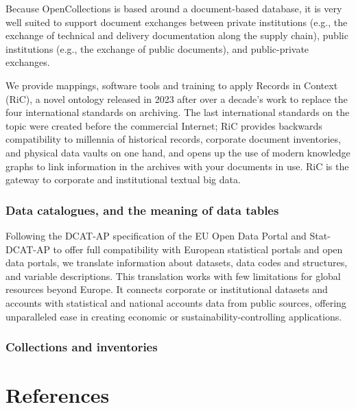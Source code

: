 \documentclass[
  letterpaper,
  DIV=11,
  numbers=noendperiod]{scrreprt}
\begin{document}
Because OpenCollections is based around a document-based database, it is
very well suited to support document exchanges between private
institutions (e.g., the exchange of technical and delivery documentation
along the supply chain), public institutions (e.g., the exchange of
public documents), and public-private exchanges.

We provide mappings, software tools and training to apply Records in
Context (RiC), a novel ontology released in 2023 after over a decade's
work to replace the four international standards on archiving. The last
international standards on the topic were created before the commercial
Internet; RiC provides backwards compatibility to millennia of
historical records, corporate document inventories, and physical data
vaults on one hand, and opens up the use of modern knowledge graphs to
link information in the archives with your documents in use. RiC is the
gateway to corporate and institutional textual big data.

\subsection{Data catalogues, and the meaning of data
tables}\label{data-catalogues-and-the-meaning-of-data-tables}

Following the DCAT-AP specification of the EU Open Data Portal and
Stat-DCAT-AP to offer full compatibility with European statistical
portals and open data portals, we translate information about datasets,
data codes and structures, and variable descriptions. This translation
works with few limitations for global resources beyond Europe. It
connects corporate or institutional datasets and accounts with
statistical and national accounts data from public sources, offering
unparalleled ease in creating economic or sustainability-controlling
applications.

\subsection{Collections and
inventories}\label{collections-and-inventories}


\chapter*{References}\label{references}

\end{document}
